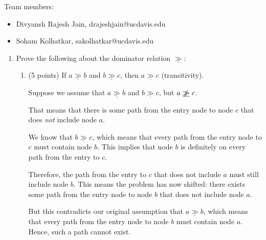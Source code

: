 \documentclass[12pt]{article}
\newcommand{\dom}{\underline{\gg}}
\begin{document}
    \begin{mdframed}
      Team members:
      \begin{itemize}
        \item Divyansh Rajesh Jain, drajeshjain@ucdavis.edu %
        \item Soham Kolhatkar, sakolhatkar@ucdavis.edu %
      \end{itemize}
    \end{mdframed}
    
    \newpage
    \begin{enumerate}

      
      \item Prove the following about the dominator relation $\dom$:
      \begin{enumerate}
        \item (5 points) If $a \dom b$ and $b \dom c$, then $a \dom c$
        (transitivity).
        \begin{mdframed}
          Suppose we assume that \( a \dom b \) and \( b \dom c \), but \( a \centernot{\dom} c \).

          \medskip

          That means that there is some path from the entry node to node \( c \) that does \emph{not} include node \( a \).

          \medskip

          We know that \( b \dom c \), which means that every path from the entry node to \( c \) must contain node \( b \).  
          This implies that node \( b \) is definitely on every path from the entry to \( c \).

          \medskip

          Therefore, the path from the entry to \( c \) that does not include \( a \) must still include node \( b \).  
          This means the problem has now shifted: there exists some path from the entry node to node \( b \) that does not include node \( a \).

          \medskip

          But this contradicts our original assumption that \( a \dom b \), which means that every path from the entry node to node \( b \) must contain node \( a \).  
          Hence, such a path cannot exist.


\end{mdframed}
\end{enumerate}
\end{enumerate}
\end{document}
